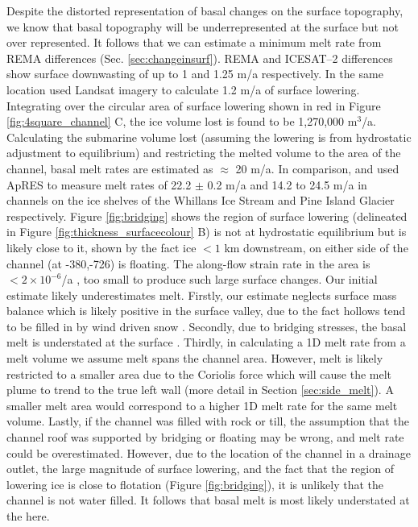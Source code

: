 Despite the distorted representation of basal changes on the surface topography, we know that basal topography will be underrepresented at the surface but not over represented. It follows that we can estimate a minimum melt rate from REMA differences (Sec. \ref{sec:changeinsurf}). REMA and ICESAT--2 differences show surface downwasting of up to 1 and 1.25 m/a respectively. In the same location \cite{kim2016active} used Landsat imagery to calculate 1.2 m/a of surface lowering.
Integrating over the circular area of surface lowering shown in red in Figure \ref{fig:4square_channel} C, the ice volume lost is found to be 1,270,000 $\mathrm{m}^3$/a. Calculating the submarine volume lost (assuming the lowering is from hydrostatic adjustment to equilibrium) and restricting the melted volume to the area of the channel, basal melt rates are estimated as $\approx$ 20 m/a. In comparison, \cite{marsh2016high} and \cite{stanton2013channelized} used ApRES to measure melt rates of 22.2 $\pm$ 0.2 m/a and 14.2 to 24.5 m/a in channels on the ice shelves of the Whillans Ice Stream and Pine Island Glacier respectively. 
Figure \ref{fig:bridging} shows the region of surface lowering (delineated in Figure \ref{fig:thickness_surfacecolour} B) is not at hydrostatic equilibrium but is likely close to it, shown by the fact ice $<1$ km downstream, on either side of the channel (at -380,-726) is floating. 
The along-flow strain rate in the area is $< 2 \times 10 ^{-6}$/a \citep{alley2018continent}, too small to produce such large surface changes. 
Our initial estimate likely underestimates melt. Firstly, our estimate neglects surface mass balance which is likely positive in the surface valley, due to the fact hollows tend to be filled in by wind driven snow \citep[e.g.][]{gow1965relationship}. Secondly, due to bridging stresses, the basal melt is understated at the surface \citep{drews2015evolution}.  Thirdly, in calculating a 1D melt rate from a melt volume we assume melt spans the channel area. However, melt is likely restricted to a smaller area due to the Coriolis force which will cause the melt plume to trend to the true left wall (more detail in Section \ref{sec:side_melt}). A smaller melt area would correspond to a higher 1D melt rate for the same melt volume.  
Lastly, if the channel was filled with rock or till, the assumption that the channel roof was supported by bridging or floating may be wrong, and melt rate could be overestimated. However, due to the location of the channel in a drainage outlet, the large magnitude of surface lowering, and the fact that the region of lowering ice is close to flotation (Figure \ref{fig:bridging}), it is unlikely that the channel is not water filled. It follows that basal melt is most likely understated at the here.

